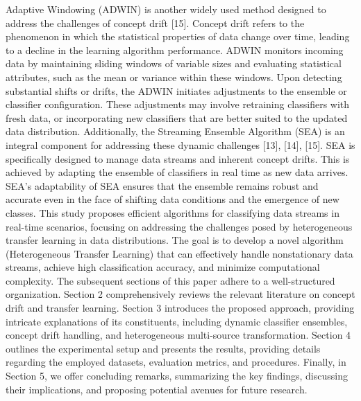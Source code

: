 Adaptive Windowing (ADWIN) is another widely used method designed to address the challenges of concept drift [15]. Concept drift refers to the phenomenon in which the statistical properties of data change over time, leading to a decline in the learning algorithm performance. ADWIN monitors incoming data by maintaining sliding windows of variable sizes and evaluating statistical attributes, such as the mean or variance within these windows. Upon detecting substantial shifts or drifts, the ADWIN initiates adjustments to the ensemble or classifier configuration. These adjustments may involve retraining classifiers with fresh data, or incorporating new classifiers that are better suited to the updated data distribution. Additionally, the Streaming Ensemble Algorithm (SEA) is an integral component for addressing these dynamic challenges [13], [14], [15]. SEA is specifically designed to manage data streams and inherent concept drifts. This is achieved by adapting the ensemble of classifiers in real time as new data arrives. SEA's adaptability of SEA ensures that the ensemble remains robust and accurate even in the face of shifting data conditions and the emergence of new classes.
This study proposes efficient algorithms for classifying data streams in real-time scenarios, focusing on addressing the challenges posed by heterogeneous transfer learning in data distributions. The goal is to develop a novel algorithm (Heterogeneous Transfer Learning) that can effectively handle nonstationary data streams, achieve high classification accuracy, and minimize computational complexity. 
The subsequent sections of this paper adhere to a well-structured organization. Section 2 comprehensively reviews the relevant literature on concept drift and transfer learning. Section 3 introduces the proposed approach, providing intricate explanations of its constituents, including dynamic classifier ensembles, concept drift handling, and heterogeneous multi-source transformation. Section 4 outlines the experimental setup and presents the results, providing details regarding the employed datasets, evaluation metrics, and procedures. Finally, in Section 5, we offer concluding remarks, summarizing the key findings, discussing their implications, and proposing potential avenues for future research.

